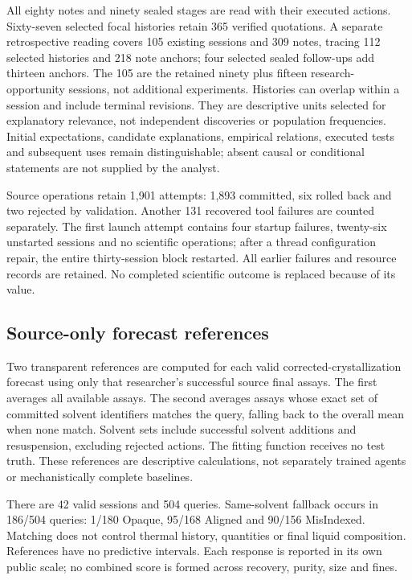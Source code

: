 \documentclass[10pt,a4paper]{article}
\begin{document}
All eighty notes and ninety sealed stages are read with their executed actions. Sixty-seven selected focal histories retain 365 verified quotations. A separate retrospective reading covers 105 existing sessions and 309 notes, tracing 112 selected histories and 218 note anchors; four selected sealed follow-ups add thirteen anchors. The 105 are the retained ninety plus fifteen research-opportunity sessions, not additional experiments. Histories can overlap within a session and include terminal revisions. They are descriptive units selected for explanatory relevance, not independent discoveries or population frequencies. Initial expectations, candidate explanations, empirical relations, executed tests and subsequent uses remain distinguishable; absent causal or conditional statements are not supplied by the analyst.

Source operations retain 1,901 attempts: 1,893 committed, six rolled back and two rejected by validation. Another 131 recovered tool failures are counted separately. The first launch attempt contains four startup failures, twenty-six unstarted sessions and no scientific operations; after a thread configuration repair, the entire thirty-session block restarted. All earlier failures and resource records are retained. No completed scientific outcome is replaced because of its value.

\subsection{Source-only forecast references}\label{source-only-forecast-references}

Two transparent references are computed for each valid corrected-crystallization forecast using only that researcher's successful source final assays. The first averages all available assays. The second averages assays whose exact set of committed solvent identifiers matches the query, falling back to the overall mean when none match. Solvent sets include successful solvent additions and resuspension, excluding rejected actions. The fitting function receives no test truth. These references are descriptive calculations, not separately trained agents or mechanistically complete baselines.

There are 42 valid sessions and 504 queries. Same-solvent fallback occurs in 186/504 queries: 1/180 Opaque, 95/168 Aligned and 90/156 MisIndexed. Matching does not control thermal history, quantities or final liquid composition. References have no predictive intervals. Each response is reported in its own public scale; no combined score is formed across recovery, purity, size and fines.
\end{document}
